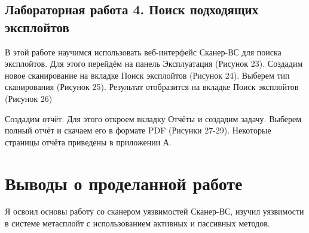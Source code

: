 \FloatBarrier
\clearpage



\subsection{Лабораторная работа 4. Поиск подходящих эксплойтов}
В этой работе научимся использовать веб-интерфейс Сканер-ВС для поиска
эксплойтов. Для этого перейдём на панель Эксплуатация (Рисунок 23). Создадим новое сканирование на вкладке Поиск эксплойтов (Рисунок 24). Выберем тип сканирования (Рисунок 25). Результат отобразится на вкладке Поиск эксплойтов (Рисунок 26)

\FloatBarrier

Создадим отчёт. Для этого откроем вкладку Отчёты и создадим задачу. Выберем полный отчёт и скачаем его в формате PDF (Рисунки 27-29). Некоторые страницы отчёта приведены в приложении А.

\FloatBarrier

\clearpage


\section{Выводы о проделанной работе}
Я освоил основы работу со сканером уязвимостей Сканер-ВС, изучил уязвимости в системе метасплойт с использованием активных и пассивных методов.

\clearpage